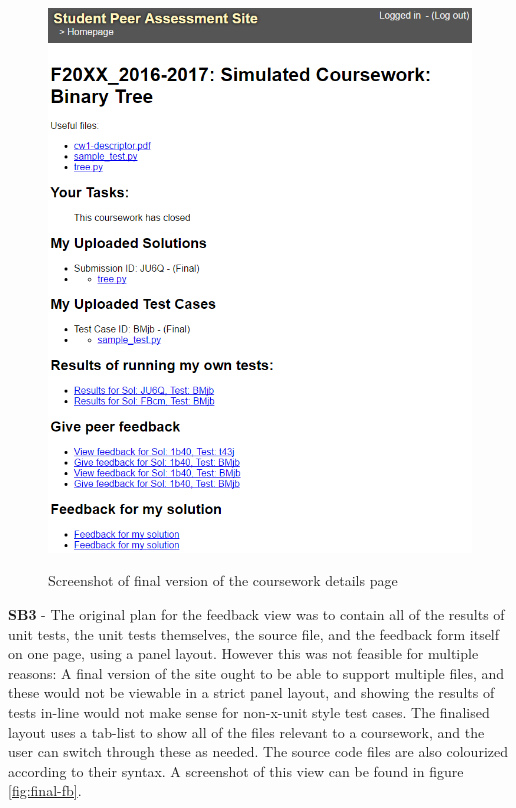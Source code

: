 \documentclass[a4paper,11pt]{report}
\begin{document}
\begin{figure}[ht]
\includegraphics[height=0.8\textheight]{storyboard/Final-cw.png}
\label{fig:final-cw}
\caption{Screenshot of final version of the coursework details page}
\end{figure}
\textbf{SB3} - The original plan for the feedback view was to contain all of the results of unit tests, the unit tests themselves, the source file, and the feedback form itself on one page, using a panel layout. However this was not feasible for multiple reasons: A final version of the site ought to be able to support multiple files, and these would not be viewable in a strict panel layout, and showing the results of tests in-line would not make sense for non-x-unit style test cases. The finalised layout uses a tab-list to show all of the files relevant to a coursework, and the user can switch through these as needed. The source code files are also colourized according to their syntax. A screenshot of this view can be found in figure \ref{fig:final-fb}.\par
\end{document}
